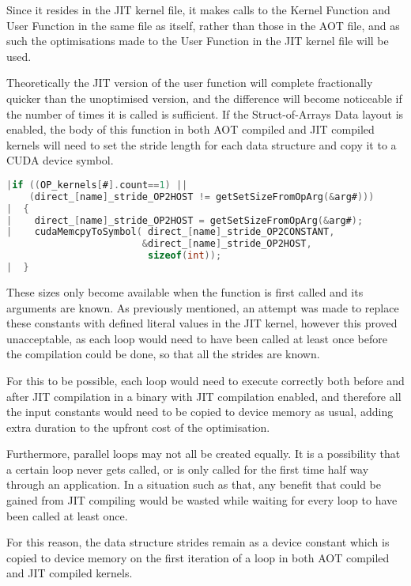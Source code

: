 \noindent Since it resides in the JIT kernel file, it makes calls to the Kernel Function and User Function in the same file as itself, rather than those in the AOT file, and as such the optimisations made to the User Function in the JIT kernel file will be used.
\par Theoretically the JIT version of the user function will complete fractionally quicker than the unoptimised version, and the difference will become noticeable if the number of times it is called is sufficient.
\clearpage
{}
If the Struct-of-Arrays Data layout is enabled, the body of this function in both AOT compiled and JIT compiled kernels will need to set the stride length for each data structure and copy it to a CUDA device symbol.
\begin{lstlisting}[linewidth = \textwidth, framesep=0pt,escapechar=:, language=C,backgroundcolor=\color{red!20}]
|if ((OP_kernels[#].count==1) ||
    (direct_[name]_stride_OP2HOST != getSetSizeFromOpArg(&arg#)))
|  {
|    direct_[name]_stride_OP2HOST = getSetSizeFromOpArg(&arg#);
|    cudaMemcpyToSymbol( direct_[name]_stride_OP2CONSTANT,
                        &direct_[name]_stride_OP2HOST,
                         sizeof(int));
|  }
\end{lstlisting}


\noindent These sizes only become available when the function is first called and its arguments are known. As previously mentioned, an attempt was made to replace these constants with defined literal values in the JIT kernel, however this proved unacceptable, as each loop would need to have been called at least once before the compilation could be done, so that all the strides are known.
\par
For this to be possible, each loop would need to execute correctly both before and after JIT compilation in a binary with JIT compilation enabled, and therefore all the input constants would need to be copied to device memory as usual, adding extra duration to the upfront cost of the optimisation.
\par
Furthermore, parallel loops may not all be created equally. It is a possibility that a certain loop never gets called, or is only called for the first time half way through an application. In a situation such as that, any benefit that could be gained from JIT compiling would be wasted while waiting for every loop to have been called at least once.
\par
For this reason, the data structure strides remain as a device constant which is copied to device memory on the first iteration of a loop in both AOT compiled and JIT compiled kernels.

